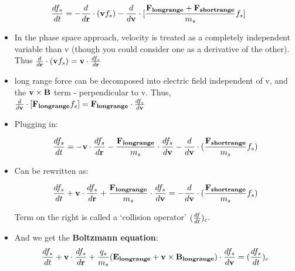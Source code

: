 \[ \frac{d f_s}{d t} = -\frac{d }{d \mathbf{r}} \cdot (\mathbf{v} f_s) - \frac{d }{d \mathbf{v}} \cdot [\frac{\mathbf{F_{long range}} + \mathbf{F_{short range}}}{m_s} f_s] \]

\begin{itemize}
	\item In the phase space approach, velocity is treated as a completely independent variable than v (though you could consider one as a derivative of the other). Thus $\frac{d }{d \mathbf{r}} \cdot (\mathbf{v} f_s) = \mathbf{v} \cdot	\frac{d f_s}{d \mathbf{r}}$
		\item long range force can be decomposed into electric field independent of v, and the  $\mathbf{v} \times \mathbf{B}$ term - perpendicular to v. Thus, $\frac{d }{d \mathbf{v}} \cdot [\mathbf{F_{long range}} f_s] = \mathbf{F_{long range}}\cdot\frac{d f_s}{d \mathbf{v}} $
	\item Plugging in:
	
	\[ \frac{d f_s}{d t} = -\mathbf{v}\cdot\frac{d f_s}{d \mathbf{r}} - \frac{\mathbf{F_{long range}}}{m_s} \cdot \frac{d f_s}{d \mathbf{v}} - \frac{d }{d \mathbf{v}} \cdot (\frac{\mathbf{F_{short range}}}{m_s} f_s) \]
	\item Can be rewritten as:
	
	\[ \frac{d f_s}{d t} +\mathbf{v}\cdot\frac{d f_s}{d \mathbf{r}} + \frac{\mathbf{F_{long range}}}{m_s} \cdot \frac{d f_s}{d \mathbf{v}} = - \frac{d }{d \mathbf{v}} \cdot (\frac{\mathbf{F_{short range}}}{m_s} f_s) \]
	
	Term on the right is called a `collision operator' $(\frac{d f}{d t})_c$.	
	
\item And we get the \textbf{Boltzmann equation}:
	\[ \frac{d f_s}{d t} +\mathbf{v}\cdot\frac{d f_s}{d \mathbf{r}} + \frac{q_s}{m_s}(\mathbf{E_{long range}} + \mathbf{v} \times \mathbf{B_{long range}}) \cdot \frac{d f_s}{d \mathbf{v}} = (\frac{d f_s}{d t})_c \]
\end {itemize}

\[   \]


